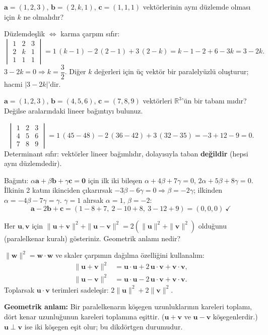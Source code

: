 \begin{soru}
$\mathbf a=(1,2,3)$, $\mathbf b=(2,k,1)$, $\mathbf c=(1,1,1)$ vektörlerinin aynı düzlemde olması için $k$ ne olmalıdır?
\end{soru}
\begin{cevap}
Düzlemdeşlik $\iff$ karma çarpım sıfır:
\[
\begin{vmatrix}1&2&3\\2&k&1\\1&1&1\end{vmatrix}
=1\,(k-1)-2\,(2-1)+3\,(2-k)=k-1-2+6-3k=3-2k .
\]
$3-2k=0\Rightarrow k=\dfrac32$. Diğer $k$ değerleri için üç vektör bir paralelyüzlü oluşturur; hacmi $|3-2k|$'dir.
\end{cevap}

\begin{soru}
$\mathbf a=(1,2,3)$, $\mathbf b=(4,5,6)$, $\mathbf c=(7,8,9)$ vektörleri $\mathbb R^3$'ün bir tabanı mıdır? Değilse aralarındaki lineer bağıntıyı bulunuz.
\end{soru}
\begin{cevap}
\[
\begin{vmatrix}1&2&3\\4&5&6\\7&8&9\end{vmatrix}=1\,(45-48)-2\,(36-42)+3\,(32-35)=-3+12-9=0 .
\]
Determinant sıfır: vektörler lineer bağımlıdır, dolayısıyla taban \textbf{değildir} (hepsi aynı düzlemdedir).

Bağıntı: $\alpha\mathbf a+\beta\mathbf b+\gamma\mathbf c=\mathbf 0$ için ilk iki bileşen
$\alpha+4\beta+7\gamma=0$, $2\alpha+5\beta+8\gamma=0$. İlkinin 2 katını ikinciden çıkarırsak $-3\beta-6\gamma=0\Rightarrow\beta=-2\gamma$; ilkinden $\alpha=-4\beta-7\gamma=\gamma$. $\gamma=1$ alırsak $\alpha=1$, $\beta=-2$:
\[
\mathbf a-2\mathbf b+\mathbf c=(1-8+7,\ 2-10+8,\ 3-12+9)=(0,0,0)\ \checkmark
\]
\end{cevap}

\begin{soru}
Her $\mathbf u,\mathbf v$ için $\|\mathbf u+\mathbf v\|^2+\|\mathbf u-\mathbf v\|^2=2\left(\|\mathbf u\|^2+\|\mathbf v\|^2\right)$ olduğunu (paralelkenar kuralı) gösteriniz. Geometrik anlamı nedir?
\end{soru}
\begin{cevap}
$\|\mathbf w\|^2=\mathbf w\cdot\mathbf w$ ve skaler çarpımın dağılma özelliğini kullanalım:
\begin{align*}
\|\mathbf u+\mathbf v\|^2&=\mathbf u\cdot\mathbf u+2\,\mathbf u\cdot\mathbf v+\mathbf v\cdot\mathbf v,\\
\|\mathbf u-\mathbf v\|^2&=\mathbf u\cdot\mathbf u-2\,\mathbf u\cdot\mathbf v+\mathbf v\cdot\mathbf v .
\end{align*}
Toplarsak $\mathbf u\cdot\mathbf v$ terimleri sadeleşir: $2\|\mathbf u\|^2+2\|\mathbf v\|^2$.

\textbf{Geometrik anlam:} Bir paralelkenarın köşegen uzunluklarının kareleri toplamı, dört kenar uzunluğunun kareleri toplamına eşittir. ($\mathbf u+\mathbf v$ ve $\mathbf u-\mathbf v$ köşegenlerdir.) $\mathbf u\perp\mathbf v$ ise iki köşegen eşit olur; bu dikdörtgen durumudur.
\end{cevap}


